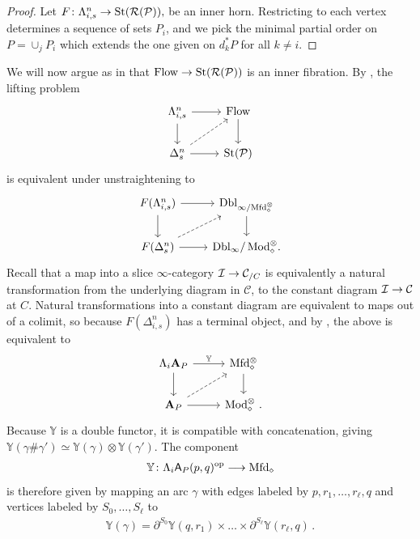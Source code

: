 \documentclass[10pt]{amsart}
\numberwithin{equation}{section}
\theoremstyle{definition}
\DeclareMathOperator{\Mod}{Mod}
\DeclareMathOperator{\op}{op}
\DeclareMathOperator{\St}{St}
\newcommand{\PreFlow}{\mathrm{Flow}\vphantom{w}}
\newcommand{\Mfd}{\mathrm{Mfd}\vphantom{d}}
\newcommand{\bY}{\mathbb{Y}}
\newcommand{\Horn}{\Lambda}
\newcommand{\cC}{\mathcal{C}}
\newcommand{\cI}{\mathcal{I}}
\newcommand{\cP}{\mathcal{P}}
\newcommand{\cR}{\mathcal{R}}
\newcommand{\bfA}{\mathbf{A}}
\newcommand{\sfA}{\mathsf{A}}
\newcommand{\Dbl}{\mathrm{Dbl}}
\newcommand{\del}{\partial}
\renewcommand{\to}{\mathchoice{\longrightarrow}{\rightarrow}{}{}}
\begin{document}
\begin{proof}
	Let $F\colon \Horn_{i,s}^{n} \to \St(\cR(\cP)),$ be an inner horn.
	Restricting to each vertex determines a sequence of sets $P_i$, and we pick the minimal partial order on $P = \cup_j P_i$ which extends the one given on $d_{k}^{*}P$ for all $k\neq i $.
\end{proof}
We will now argue as in \cite[Section 5]{AB} that $\PreFlow \to \St(\cR(\cP))$ is an inner fibration.
By , the lifting problem
\begin{equation*}
	\begin{tikzcd}
		\Horn^{n}_{i,s} \arrow[r] \arrow[d]      &   \PreFlow  \arrow[d] \\
		\Delta^{n}_{s}  \arrow[r] \arrow[ur,dashed]              &  \St(\cP)
	\end{tikzcd}
\end{equation*}
is equivalent under unstraightening to
\begin{equation*}
	\begin{tikzcd}
		F(\Horn_{i,s}^{n}) \arrow[r] \arrow[d]      &   \Dbl_{\infty/\Mfd_{\diamond}^{\otimes}}  \arrow[d] \\
		F(\Delta^{n}_{s})  \arrow[r] \arrow[ur,dashed]         &  \Dbl_\infty{/\Mod_{\diamond}^{\otimes}}.
	\end{tikzcd}
\end{equation*}
Recall that a map into a slice $\infty$-category $\cI \to \cC_{/C}$ is equivalently a natural transformation from the underlying diagram in $\cC$, to the constant diagram $\cI \to \cC$ at $C$.
Natural transformations into a constant diagram are equivalent to maps out of a colimit, so because $F(\Delta^{n}_{i,s})$ has a terminal object, and by , the above is equivalent to
\begin{equation*}
	\begin{tikzcd}
		\Horn_{i}\bfA_{P} \arrow[r, "\bY"] \arrow[d]      &   \Mfd_{\diamond}^{\otimes}  \arrow[d] \\
		\bfA_{P}  \arrow[r]\arrow[ur,dashed]           &  \Mod_{\diamond}^{\otimes} \, .
	\end{tikzcd}
\end{equation*}
Because $\bY$ is a double functor, it is compatible with concatenation, giving $\bY(\gamma \# \gamma') \simeq \bY(\gamma) \otimes \bY(\gamma')$. The component
\begin{align*}
	\bY \colon \Horn_{i}\sfA_{P}(p,q)^{\op} \to \Mfd_{\diamond}
\end{align*}
is therefore given by mapping an arc $\gamma$ with edges labeled by $p,r_{1},\dots ,r_{\ell}, q$ and vertices labeled by $S_0,\dots, S_{\ell}$ to
\begin{align*}
	\bY(\gamma) = \del^{S_0} \bY(q,r_1) \times \dots \times \del^{S_{\ell}}\bY(r_{\ell}, q) \,.
\end{align*}
\end{document}

